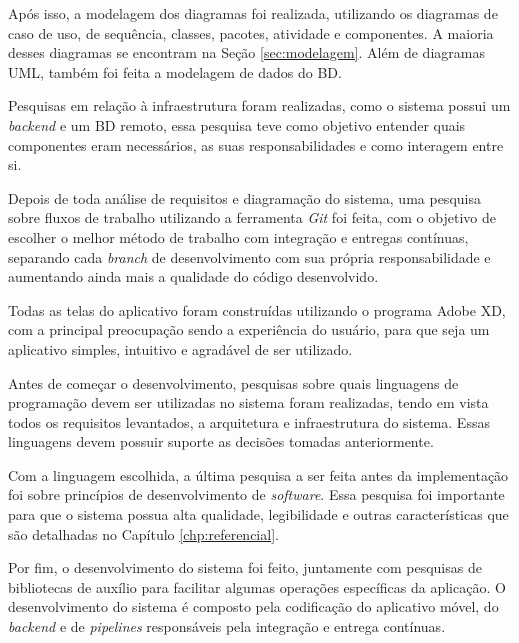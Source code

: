 Após isso, a modelagem dos diagramas foi realizada, utilizando os diagramas de caso de uso, de sequência, classes, pacotes, atividade e componentes. A maioria desses diagramas se encontram na Seção \ref{sec:modelagem}. Além de diagramas UML, também foi feita a modelagem de dados do BD.

Pesquisas em relação à infraestrutura foram realizadas, como o sistema possui um \textit{backend} e um BD remoto, essa pesquisa teve como objetivo entender quais componentes eram necessários, as suas responsabilidades e como interagem entre si.

Depois de toda análise de requisitos e diagramação do sistema, uma pesquisa sobre fluxos de trabalho utilizando a ferramenta \textit{Git} foi feita, com o objetivo de escolher o melhor método de trabalho com integração e entregas contínuas, separando cada \textit{branch} de desenvolvimento com sua própria responsabilidade e aumentando ainda mais a qualidade do código desenvolvido.

Todas as telas do aplicativo foram construídas utilizando o programa Adobe XD, com a principal preocupação sendo a experiência do usuário, para que seja um aplicativo simples, intuitivo e agradável de ser utilizado.

Antes de começar o desenvolvimento, pesquisas sobre quais linguagens de programação devem ser utilizadas no sistema foram realizadas, tendo em vista todos os requisitos levantados, a arquitetura e infraestrutura do sistema. Essas linguagens devem possuir suporte as decisões tomadas anteriormente.

Com a linguagem escolhida, a última pesquisa a ser feita antes da implementação foi sobre princípios de desenvolvimento de \textit{software}. Essa pesquisa foi importante para que o sistema possua alta qualidade, legibilidade e outras características que são detalhadas no Capítulo \ref{chp:referencial}.

Por fim, o desenvolvimento do sistema foi feito, juntamente com pesquisas de bibliotecas de auxílio para facilitar algumas operações específicas da aplicação. O desenvolvimento do sistema é composto pela codificação do aplicativo móvel, do \textit{backend} e de \textit{pipelines} responsáveis pela integração e entrega contínuas.
